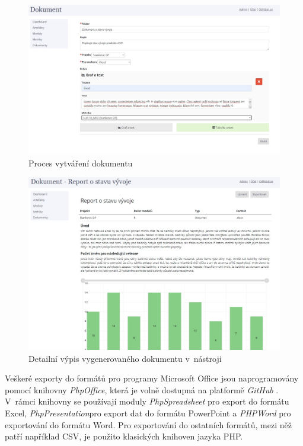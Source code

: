 \documentclass[czech,master]{diploma}
\begin{document}
\begin{figure}[!ht]
    \centering
    \includegraphics[width=1\textwidth]{Diplomka/Figures/report_document.jpg}
    \caption{Proces vytváření dokumentu}
    \label{fig:report_document}
\end{figure}

\begin{figure}[!ht]
    \centering
    \includegraphics[width=1\textwidth]{Diplomka/Figures/report_document_detail.jpg}
    \caption{Detailní výpis vygenerovaného dokumentu v~nástroji}
    \label{fig:report_document_detail}
\end{figure}

Veškeré exporty do formátů pro programy Microsoft Office jsou naprogramovány pomocí knihovny \textit{PhpOffice}, která je volně dostupná na platformě \textit{GitHub} \cite{ref:phpoffice}. V~rámci knihovny se používají moduly \textit{PhpSpreadsheet} pro export do formátu Excel, \textit{PhpPresentation}pro export dat do formátu PowerPoint a \textit{PHPWord} pro exportování do formátu Word. Pro exportování do ostatních formátů, mezi něž patří například CSV, je použito klasických knihoven jazyka PHP.
\end{document}
